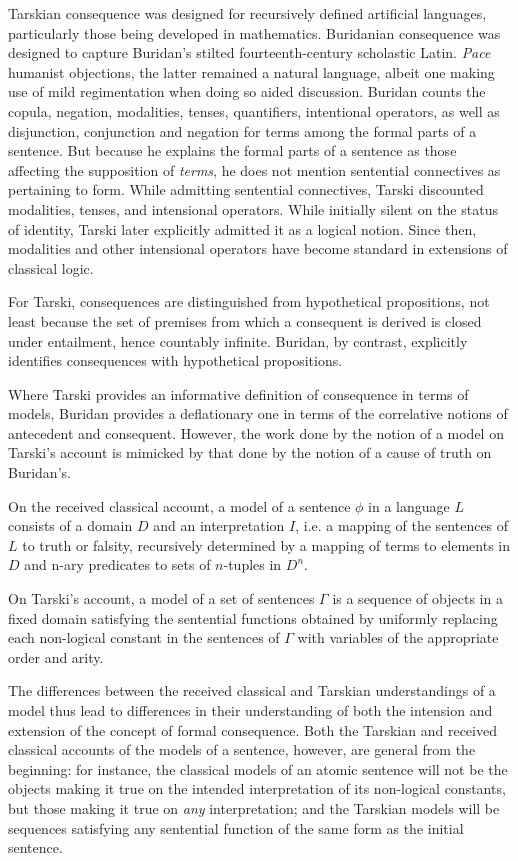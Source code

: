 \documentclass[]{article}
\begin{document}
Tarskian consequence was designed for recursively defined artificial languages, particularly those being developed in mathematics. Buridanian consequence was designed to capture Buridan's stilted fourteenth-century scholastic Latin. \textit{Pace} humanist objections, the latter remained a natural language, albeit one making use of mild regimentation when doing so aided discussion. Buridan counts the copula, negation, modalities, tenses, quantifiers, intentional operators, as well as disjunction, conjunction and negation for terms among the formal parts of a sentence. But because he explains the formal parts of a sentence as those affecting the supposition of \textit{terms}, he does not mention sentential connectives as pertaining to form. While admitting sentential connectives, Tarski discounted modalities, tenses, and intensional operators. While initially silent on the status of identity, Tarski later explicitly admitted it as a logical notion. Since then, modalities and other intensional operators have become standard in extensions of classical logic.

For Tarski, consequences are distinguished from hypothetical propositions, not least because the set of premises from which a consequent is derived is closed under entailment, hence countably infinite. Buridan, by contrast, explicitly identifies consequences with hypothetical propositions.


Where Tarski provides an informative definition of consequence in terms of models, Buridan provides a deflationary one in terms of the correlative notions of antecedent and consequent. However, the work done by the notion of a model on Tarski's account is mimicked by that done by the notion of a cause of truth on Buridan's. 

On the received classical account, a model of a sentence $\phi$ in a language $L$ consists of a domain $D$ and an interpretation $I$, i.e. a mapping of the sentences of $L$ to truth or falsity, recursively determined by a mapping of terms to elements in $D$ and n-ary predicates to sets of $n$-tuples in $D^{n}$.

On Tarski's account, a model of a set of sentences $\Gamma$ is a sequence of objects in a fixed domain satisfying the sentential functions obtained by uniformly replacing each non-logical constant in the sentences of $\Gamma$ with variables of the appropriate order and arity. 

The differences between the received classical and Tarskian understandings of a model thus lead to differences in their understanding of both the intension and extension of the concept of formal consequence. Both the Tarskian and received classical accounts of the models of a sentence, however, are general from the beginning: for instance, the classical models of an atomic sentence will not be the objects making it true on the intended interpretation of its non-logical constants, but those making it true on \textit{any} interpretation; and the Tarskian models will be sequences satisfying any sentential function of the same form as the initial sentence.
\end{document}
